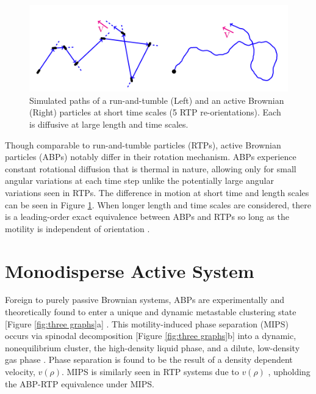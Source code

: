 \documentclass[11pt]{article}
\begin{document}
\begin{figure}[ht]
\centering\includegraphics[width=0.9\linewidth]{Screen Shot 2020-08-12 at 8.07.17 AM2.png}
\caption{Simulated paths of a run-and-tumble (Left) and an active Brownian (Right) particles at short time scales (5 RTP re-orientations).  Each is diffusive at large length and time scales. \cite{Cates6}}
\label{fig:motion}
\end{figure}

Though comparable to run-and-tumble particles (RTPs), active Brownian particles (ABPs) notably differ in their rotation mechanism. ABPs experience constant rotational diffusion that is thermal in nature, allowing only for small angular variations at each time step unlike the potentially large angular variations seen in RTPs.  The difference in motion at short time and length scales can be seen in Figure \ref{fig:motion}.  When longer length and time scales are considered, there is a leading-order exact equivalence between ABPs and RTPs so long as the motility is independent of orientation \cite{Tailleur}.  

\section{Monodisperse Active System}\label{monodisperseABPactivity}

Foreign to purely passive Brownian systems, ABPs are experimentally \cite{Palacci, Theurkauff} and theoretically \cite{Redner, Bialke, Stenhammar4} found to enter a unique and dynamic metastable clustering state [Figure \ref{fig:three graphs}a] \cite{Speck}.  This motility-induced phase separation (MIPS) occurs via spinodal decomposition [Figure \ref{fig:three graphs}b] into a dynamic, nonequilibrium cluster, the high-density liquid phase, and a dilute, low-density gas phase \cite{Stenhammar3}.  Phase separation is found to be the result of a density dependent velocity, $v(\rho)$.  MIPS is similarly seen in RTP systems due to $v(\rho)$ \cite{Cates}, upholding the ABP-RTP equivalence under MIPS.
\end{document}
